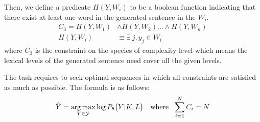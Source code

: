 \documentclass[11pt]{article}
\begin{document}
Then, we define a predicate $H(Y, W_i)$ to be a boolean function indicating that there exist at least one word in the generated sentence in the $W_i$.
\begin{align}
    C_3 = H(Y, W_1)& \wedge H(Y, W_2) ... \wedge H(Y, W_n)\\
    H(Y, W_i)& \equiv \exists \ j, y_j \in W_i
\end{align}
where $C_3$ is the constraint on the species of complexity level which means the lexical levels of the generated sentence need cover all the given levels. 

The task requires to seek optimal sequences in which all constraints are satisfied as much as possible. The formula is as follows:
\begin{equation}
\hat{Y} = \mathop{\rm{arg\,max}}\limits_{Y \in \mathcal{Y}}\log P_\theta\big(Y|K,L \big) \ \ \ \text{where} \ \ \sum\limits_{i=1}^{N}C_i=N %
\end{equation}
\end{document}
